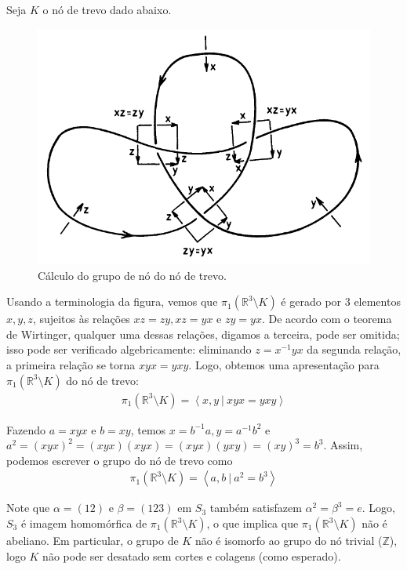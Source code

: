 	\begin{example}[Nó de trevo]
		Seja $K$ o nó de trevo dado abaixo.
		\begin{figure}[H]
			\begin{center}
				\includegraphics[width=12cm]{Images/gruponotrevo.png}
			\end{center}\caption{Cálculo do grupo de nó do nó de trevo.}
			\label{grupo no de trevo}
		\end{figure}
		\par\vspace{0.3cm} Usando a terminologia da figura, vemos que $\pi_1(\mathbb{R}^3\setminus K)$ é gerado por $3$ elementos $x, y, z$, sujeitos às relações $xz = zy, xz = yx$ e $zy = yx$. De acordo com o teorema de Wirtinger, qualquer uma dessas relações, digamos a terceira, pode ser omitida; isso pode ser verificado algebricamente: eliminando $z = x^{-1}yx$ da segunda relação, a primeira relação se torna $xyx = yxy$. Logo, obtemos uma apresentação para $\pi_1(\mathbb{R}^3\setminus K)$ do nó de trevo:
		\begin{align*}
		\pi_1(\mathbb{R}^3\setminus K) = \left< x,y \ | \ xyx = yxy \right>
		\end{align*}
		\par\vspace{0.3cm} Fazendo $a = xyx$ e $b = xy$, temos $x = b^{-1}a, y = a^{-1}b^2$ e $a^2 = (xyx)^2 = (xyx)(xyx) = (xyx)(yxy) = (xy)^3 = b^3$. Assim, podemos escrever o grupo do nó de trevo como
		\begin{align*}
		\pi_1(\mathbb{R}^3\setminus K) = \left< a,b \ | \ a^2 = b^3 \right>
		\end{align*}
		\par\vspace{0.3cm} Note que $\alpha = (12)$ e $\beta = (123)$ em $S_3$ também satisfazem $\alpha^2 = \beta^3 = e$. Logo, $S_3$ é imagem homomórfica de $\pi_1(\mathbb{R}^3\setminus K)$, o que implica que $\pi_1(\mathbb{R}^3\setminus K)$ não é abeliano. Em particular, o grupo de $K$ não é isomorfo ao grupo do nó trivial ($\mathbb{Z}$), logo $K$ não pode ser desatado sem cortes e colagens (como esperado).
	\end{example}
